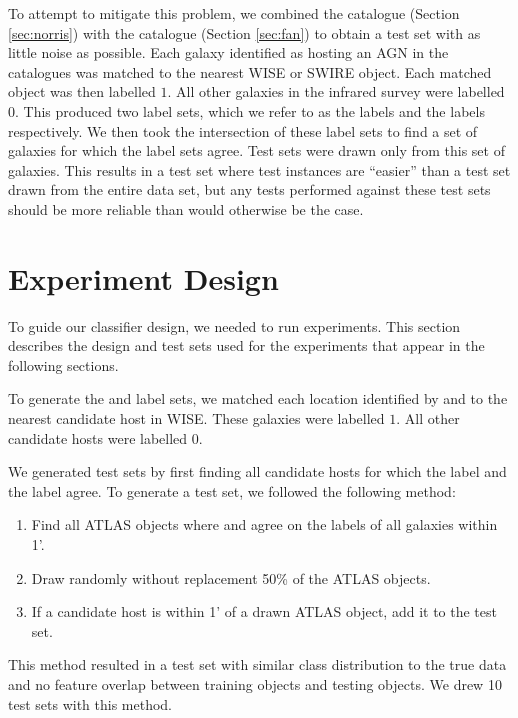   To attempt to mitigate this problem, we combined the \citeauthor{norris06}
  catalogue (Section \ref{sec:norris}) with the \citeauthor{fan15} catalogue
  (Section \ref{sec:fan}) to obtain a test set with as little noise as possible.
  Each galaxy identified as hosting an AGN in the catalogues was matched to the
  nearest WISE or SWIRE object. Each matched object was then labelled $1$. All
  other galaxies in the infrared survey were labelled $0$. This produced two
  label sets, which we refer to as the \citeauthor{norris06} labels and the
  \citeauthor{fan15} labels respectively. We then took the intersection of these
  label sets to find a set of galaxies for which the label sets agree. Test sets
  were drawn only from this set of galaxies. This results in a test set where
  test instances are ``easier'' than a test set drawn from the entire data set,
  but any tests performed against these test sets should be more reliable than
  would otherwise be the case.

\section{Experiment Design}
\label{sec:experiment-design}

  To guide our classifier design, we needed to run experiments. This section
  describes the design and test sets used for the experiments that appear in the
  following sections.

  To generate the \citeauthor{norris06} and \citeauthor{fan15} label sets, we
  matched each location identified by \citeauthor{norris06} and
  \citeauthor{fan15} to the nearest candidate host in WISE. These galaxies were
  labelled $1$. All other candidate hosts were labelled $0$.

  We generated test sets by first finding all candidate hosts for which the
  \citeauthor{norris06} label and the \citeauthor{fan15} label agree. To
  generate a test set, we followed the following method:
  \begin{enumerate}
    \item Find all ATLAS objects where \citeauthor{norris06} and
    \citeauthor{fan15} agree on the labels of all galaxies within 1'.
    \item Draw randomly without replacement 50\% of the ATLAS objects.
    \item If a candidate host is within 1' of a drawn ATLAS object, add it to
    the test set.
  \end{enumerate}
  This method resulted in a test set with similar class distribution to the true
  data and no feature overlap between training objects and testing objects. We
  drew 10 test sets with this method.

